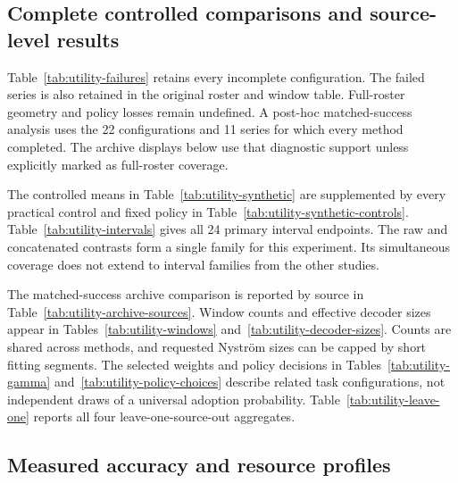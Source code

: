 \subsection{Complete controlled comparisons and source-level results}
\label{app:utility-results}

Table~\ref{tab:utility-failures} retains every incomplete configuration.
The failed series is also retained in the original roster and window
table. Full-roster geometry and policy losses remain undefined. A post-hoc matched-success analysis uses the 22 configurations and
11 series for which every method completed. The archive displays below use that
diagnostic support unless explicitly marked as full-roster coverage.



The controlled means in Table~\ref{tab:utility-synthetic} are
supplemented by every practical control and fixed policy in
Table~\ref{tab:utility-synthetic-controls}. Table~\ref{tab:utility-intervals}
gives all 24 primary interval endpoints. The raw and concatenated contrasts form a single family for this
experiment. Its simultaneous coverage does not extend to interval
families from the other studies.



\FloatBarrier

The matched-success archive comparison is reported by source in
Table~\ref{tab:utility-archive-sources}. Window counts and effective
decoder sizes appear in Tables~\ref{tab:utility-windows}
and~\ref{tab:utility-decoder-sizes}. Counts are shared across methods,
and requested Nystr\"om sizes can be capped by short fitting segments.
The selected weights and policy decisions in
Tables~\ref{tab:utility-gamma} and~\ref{tab:utility-policy-choices}
describe related task configurations, not independent draws of a
universal adoption probability. Table~\ref{tab:utility-leave-one}
reports all four leave-one-source-out aggregates.







\FloatBarrier

\subsection{Measured accuracy and resource profiles}
\label{app:utility-cost}


